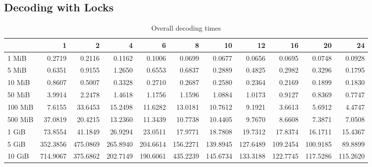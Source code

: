 \subsection{Decoding with Locks}
\begin{table}[!h]
	\caption{Overall decoding times}
	\begin{tabular}{lrrrrrrrrrr}
		\toprule
		\diagbox{File sizes }{Threads}  &        1  &        2  &        4  &        6  &        8  &        10 &        12 &        16 &        20 &        24 \\
		\midrule
		1 MiB   &    0.2719 &    0.2116 &    0.1162 &    0.1006 &    0.0699 &    0.0677 &    0.0656 &    0.0695 &    0.0748 &    0.0928 \\
		5 MiB   &    0.6351 &    0.9155 &    1.2650 &    0.6553 &    0.6837 &    0.2889 &    0.4825 &    0.2982 &    0.3296 &    0.1795 \\
		10 MiB  &    0.8607 &    0.5007 &    0.3328 &    0.2710 &    0.2687 &    0.2580 &    0.2364 &    0.2169 &    0.1899 &    0.1830 \\
		50 MiB  &    3.9914 &    2.2478 &    1.4618 &    1.1756 &    1.1596 &    1.0884 &    1.0173 &    0.9127 &    0.8369 &    0.7747 \\
		100 MiB &    7.6155 &   33.6453 &   15.2498 &   11.6282 &   13.0181 &   10.7612 &    9.1921 &    3.6613 &    5.6912 &    4.4747 \\
		500 MiB &   37.0819 &   20.4215 &   13.2360 &   11.3439 &   10.7738 &   10.4405 &    9.7670 &    8.6608 &    7.3871 &    7.0508 \\
		1 GiB   &   73.8554 &   41.1849 &   26.9294 &   23.0511 &   17.9771 &   18.7808 &   19.7312 &   17.8374 &   16.1711 &   15.4367 \\
		5 GiB   &  352.3856 &  475.0869 &  265.8940 &  204.6614 &  156.2271 &  139.8945 &  127.6489 &  109.2454 &  100.9185 &   89.8899 \\
		10 GiB  &  714.9067 &  375.6862 &  202.7149 &  190.6061 &  435.2239 &  145.6734 &  133.3188 &  122.7745 &  117.5286 &  115.2620 \\
		\bottomrule
	\end{tabular}
\end{table}

